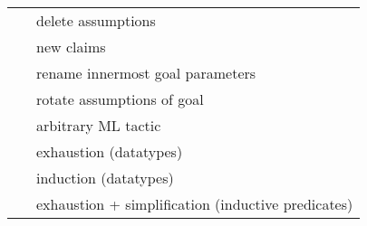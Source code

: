 \begin{isabellebody}
\begin{isamarkuptext}
\begin{tabular}{ll}
    \mbox{\isa{thin{\isacharunderscore}tac}}~\isa{{\isasymphi}} & delete assumptions \\
    \mbox{\isa{subgoal{\isacharunderscore}tac}}~\isa{{\isasymphi}} & new claims \\
    \mbox{\isa{rename{\isacharunderscore}tac}}~\isa{x} & rename innermost goal parameters \\
    \mbox{\isa{rotate{\isacharunderscore}tac}}~\isa{n} & rotate assumptions of goal \\
    \mbox{\isa{tactic}}~\isa{text} & arbitrary ML tactic \\
    \mbox{\isa{case{\isacharunderscore}tac}}~\isa{t} & exhaustion (datatypes) \\
    \mbox{\isa{induct{\isacharunderscore}tac}}~\isa{x} & induction (datatypes) \\
    \mbox{\isa{ind{\isacharunderscore}cases}}~\isa{t} & exhaustion + simplification (inductive predicates) \\
  \end{tabular}%
\end{isamarkuptext}%
\isamarkuptrue%
%
\isadelimtheory
%
\endisadelimtheory
%
\isatagtheory
{}\isamarkupfalse%
%
\endisatagtheory
{\isafoldtheory}%
%
\isadelimtheory
%
\endisadelimtheory
\isanewline
\end{isabellebody}%
